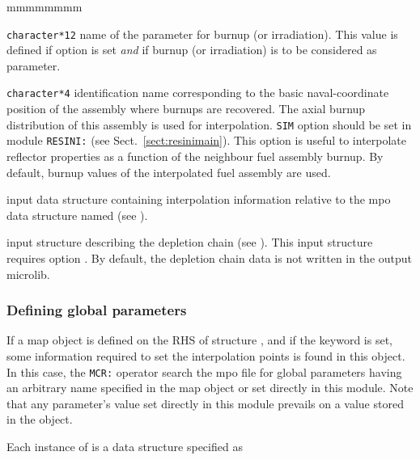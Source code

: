 \begin{ListeDeDescription}{mmmmmmmm}
\item[\dusa{namburn}] {\tt character*12} name of the parameter for burnup (or irradiation).
This value is defined if option  is set {\sl and} if burnup (or irradiation) is to be considered as parameter.

\item[\dusa{naval}] {\tt character*4} identification name corresponding to the basic naval-coordinate position of the assembly where burnups are recovered. The axial burnup distribution of this assembly is
used for interpolation. {\tt SIM} option should be set in module {\tt RESINI:} (see Sect.~\ref{sect:resinimain}). This option is useful to interpolate reflector properties as a function of the
neighbour fuel assembly burnup. By default, burnup values of the interpolated fuel assembly are used.

\item[\dusa{MCRdescints}] input data structure containing interpolation information relative to the {\sc mpo} data structure named  (see ).

\item[\dstr{descdepl}] input structure describing the depletion chain (see ). This input structure requires option . By
default, the depletion chain data is not written in the output {\sc microlib}.

\end{ListeDeDescription}

\subsubsection{Defining global parameters}\label{sect:MCRdescints}

\vskip -0.5cm

If a {\sc map} object is defined on the RHS of structure , and if the  keyword is set, some information required to set the interpolation points is found in this object.
In this case, the {\tt MCR:} operator search the {\sc mpo} file for global parameters  having an arbitrary name specified in the {\sc map} object or set directly in this module.
Note that any parameter's value set directly in this module prevails on a value stored in the  object.

Each instance of  is a data structure specified as

